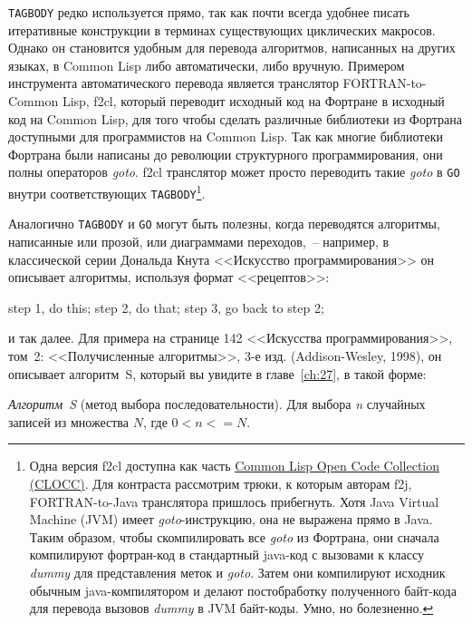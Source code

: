 \lstinline{TAGBODY} редко используется прямо, так как почти всегда удобнее писать итеративные
конструкции в терминах существующих циклических макросов. Однако он становится удобным для
перевода алгоритмов, написанных на других языках, в Common Lisp либо автоматически, либо
вручную. Примером инструмента автоматического перевода является транслятор
FORTRAN-to-Common Lisp, f2cl, который переводит исходный код на Фортране в исходный код
на Common Lisp, для того чтобы сделать различные библиотеки из Фортрана доступными для
программистов на Common Lisp. Так как многие библиотеки Фортрана были написаны до
революции структурного программирования, они полны операторов \textit{goto}. f2cl
транслятор может просто переводить такие \textit{goto} в \lstinline{GO} внутри соответствующих
\lstinline{TAGBODY}\footnote{Одна версия f2cl доступна как часть
  \href{http://clocc.sourceforge.net/}{Common Lisp Open Code Collection (CLOCC)}. Для
  контраста рассмотрим трюки, к которым авторам f2j, FORTRAN-to-Java транслятора
  пришлось прибегнуть. Хотя Java Virtual Machine (JVM) имеет \textit{goto}-инструкцию, она
  не выражена прямо в Java. Таким образом, чтобы скомпилировать все \textit{goto} из
  Фортрана, они сначала компилируют фортран-код в стандартный java-код с вызовами к 
  классу \textit{dummy} для представления меток и \textit{goto}. Затем они компилируют
  исходник обычным java-компилятором и делают постобработку полученного байт-кода для
  перевода вызовов \textit{dummy} в JVM байт-коды. Умно, но болезненно.}.

Аналогично \lstinline{TAGBODY} и \lstinline{GO} могут быть полезны, когда переводятся алгоритмы,
написанные или прозой, или диаграммами переходов,~-- например, в классической серии
Дональда Кнута <<Искусство программирования>> он описывает алгоритмы, используя формат
<<рецептов>>: 

\begin{myverb}
step 1, do this; 
step 2, do that; 
step 3, go back to step 2;
\end{myverb}

\noindent{}и так далее. Для примера на странице 142 <<Искусства программирования>>, том~2:
<<Получисленные алгоритмы>>, 3-е изд. (Addison-Wesley, 1998), он описывает алгоритм~S,
который вы увидите в главе~\ref{ch:27}, в такой форме:

\textit{Алгоритм~S} (метод выбора последовательности). Для выбора \textit{n} случайных записей из
множества $N$, где $0 < n <= N$.

